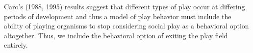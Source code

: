 \documentclass[12pt, letterpaper, fleqn]{article}
\begin{document}
	Caro's (1988, 1995) results suggest that different types of play occur at differing periods of development and thus a model of play behavior must include the ability of playing organisms to stop considering social play as a behavioral option altogether.
	Thus, we include the behavioral option of exiting the play field entirely.
	\\
	
	
\end{document}
